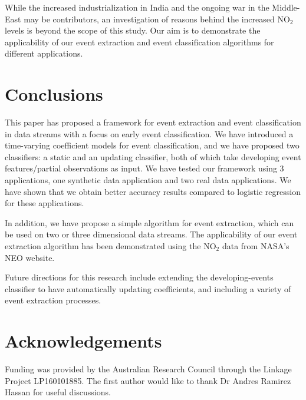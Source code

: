 \documentclass[a4paper,11pt]{article}
\begin{document}
While the increased industrialization in India and the ongoing war in the Middle-East  may be contributors, an investigation of reasons behind the increased $\text{NO}_2$ levels is beyond the scope of this study. Our aim is to demonstrate the applicability of our event extraction and event classification algorithms for different applications.

\section{Conclusions}\label{sec:Conclusions}

This paper has proposed a framework for event extraction and event classification in data streams with a focus on early event classification. We have introduced a time-varying coefficient models for event classification, and we have proposed two classifiers: a static and an updating classifier, both of which take developing event features/partial observations as input. We have tested our framework using 3 applications, one synthetic data application and two real data applications. We have shown that we obtain better accuracy results compared to logistic regression for these applications.

In addition, we have propose a simple algorithm for event extraction, which can be used on two or three dimensional data streams. The applicability of our event extraction algorithm has been demonstrated using the $\text{NO}_2$ data from NASA's NEO website.

Future directions for this research include extending the developing-events classifier to have automatically updating coefficients, and including a variety of event extraction processes.

\section*{Acknowledgements}

Funding was provided by the Australian Research Council through the Linkage Project LP160101885. The first author would like to thank Dr Andres Ramirez Hassan for useful discussions.

\footnotesize


\end{document}

